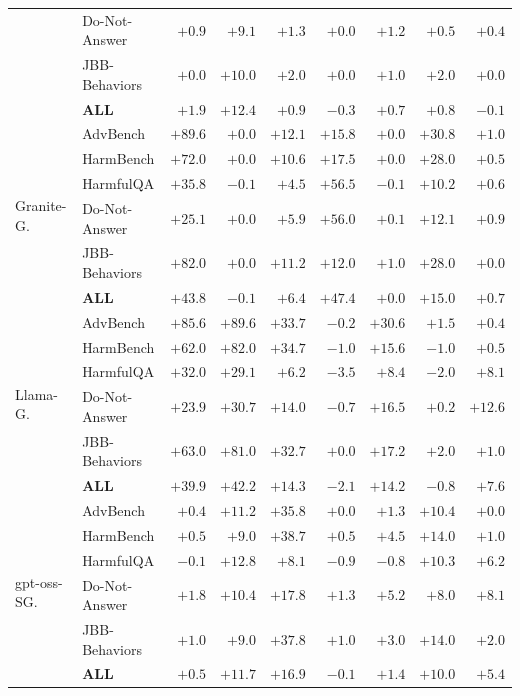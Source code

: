 \begin{table}[htbp]
\begin{tabular}{l l r r r r r r r}
 & Do-Not-Answer & $+0.9$ & $+9.1$ & $+1.3$ & $+0.0$ & $+1.2$ & $+0.5$ & $+0.4$ \\
 & JBB-Behaviors & $+0.0$ & $+10.0$ & $+2.0$ & $+0.0$ & $+1.0$ & $+2.0$ & $+0.0$ \\
 & \textbf{ALL} & $+1.9$ & $+12.4$ & $+0.9$ & $-0.3$ & $+0.7$ & $+0.8$ & $-0.1$ \\
\midrule
\multirow{6}{*}{Granite-G.}
 & AdvBench & $+89.6$ & $+0.0$ & $+12.1$ & $+15.8$ & $+0.0$ & $+30.8$ & $+1.0$ \\
 & HarmBench & $+72.0$ & $+0.0$ & $+10.6$ & $+17.5$ & $+0.0$ & $+28.0$ & $+0.5$ \\
 & HarmfulQA & $+35.8$ & $-0.1$ & $+4.5$ & $+56.5$ & $-0.1$ & $+10.2$ & $+0.6$ \\
 & Do-Not-Answer & $+25.1$ & $+0.0$ & $+5.9$ & $+56.0$ & $+0.1$ & $+12.1$ & $+0.9$ \\
 & JBB-Behaviors & $+82.0$ & $+0.0$ & $+11.2$ & $+12.0$ & $+1.0$ & $+28.0$ & $+0.0$ \\
 & \textbf{ALL} & $+43.8$ & $-0.1$ & $+6.4$ & $+47.4$ & $+0.0$ & $+15.0$ & $+0.7$ \\
\midrule
\multirow{6}{*}{Llama-G.}
 & AdvBench & $+85.6$ & $+89.6$ & $+33.7$ & $-0.2$ & $+30.6$ & $+1.5$ & $+0.4$ \\
 & HarmBench & $+62.0$ & $+82.0$ & $+34.7$ & $-1.0$ & $+15.6$ & $-1.0$ & $+0.5$ \\
 & HarmfulQA & $+32.0$ & $+29.1$ & $+6.2$ & $-3.5$ & $+8.4$ & $-2.0$ & $+8.1$ \\
 & Do-Not-Answer & $+23.9$ & $+30.7$ & $+14.0$ & $-0.7$ & $+16.5$ & $+0.2$ & $+12.6$ \\
 & JBB-Behaviors & $+63.0$ & $+81.0$ & $+32.7$ & $+0.0$ & $+17.2$ & $+2.0$ & $+1.0$ \\
 & \textbf{ALL} & $+39.9$ & $+42.2$ & $+14.3$ & $-2.1$ & $+14.2$ & $-0.8$ & $+7.6$ \\
\midrule
\multirow{6}{*}{gpt-oss-SG.}
 & AdvBench & $+0.4$ & $+11.2$ & $+35.8$ & $+0.0$ & $+1.3$ & $+10.4$ & $+0.0$ \\
 & HarmBench & $+0.5$ & $+9.0$ & $+38.7$ & $+0.5$ & $+4.5$ & $+14.0$ & $+1.0$ \\
 & HarmfulQA & $-0.1$ & $+12.8$ & $+8.1$ & $-0.9$ & $-0.8$ & $+10.3$ & $+6.2$ \\
 & Do-Not-Answer & $+1.8$ & $+10.4$ & $+17.8$ & $+1.3$ & $+5.2$ & $+8.0$ & $+8.1$ \\
 & JBB-Behaviors & $+1.0$ & $+9.0$ & $+37.8$ & $+1.0$ & $+3.0$ & $+14.0$ & $+2.0$ \\
 & \textbf{ALL} & $+0.5$ & $+11.7$ & $+16.9$ & $-0.1$ & $+1.4$ & $+10.0$ & $+5.4$ \\
\bottomrule
\end{tabular}

\end{table}
